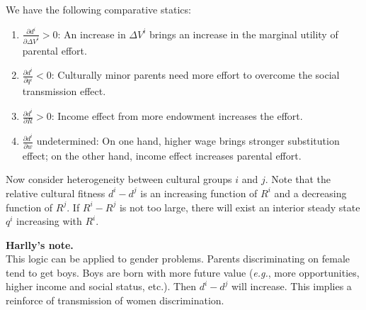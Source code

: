 \documentclass[12pt]{article}
\begin{document}
We have the following comparative statics:
\begin{enumerate}[label=(\arabic*)]
    \item $\frac{\partial d^i}{\partial \Delta V^i}>0$: An increase in $\Delta V^i$ brings an increase in the marginal utility of parental effort.
    \item $\frac{\partial d^i}{\partial q^i}<0$: Culturally minor parents need more effort to overcome the social transmission effect.
    \item $\frac{\partial d^i}{\partial R}>0$: Income effect from more endowment increases the effort.
    \item $\frac{\partial d^i}{\partial w}$ undetermined: On one hand, higher wage brings stronger substitution effect; on the other hand, income effect increases parental effort.
\end{enumerate}

Now consider heterogeneity between cultural groups $i$ and $j$. Note that the relative cultural fitness $d^i-d^j$ is an increasing function of $R^i$ and a decreasing function of $R^j$. If $R^i-R^j$ is not too large, there will exist an interior steady state $q^i$ increasing with $R^i$. 

{\color{blue}
\small
    \noindent\textbf{Harlly's note.}\\
    This logic can be applied to gender problems. Parents discriminating on female tend to get boys. Boys are born with more future value (\textit{e.g.}, more opportunities, higher income and social status, etc.). Then $d^i-d^j$ will increase. This implies a reinforce of transmission of women discrimination.
}

\setlength\bibsep{0pt}


\end{document}
